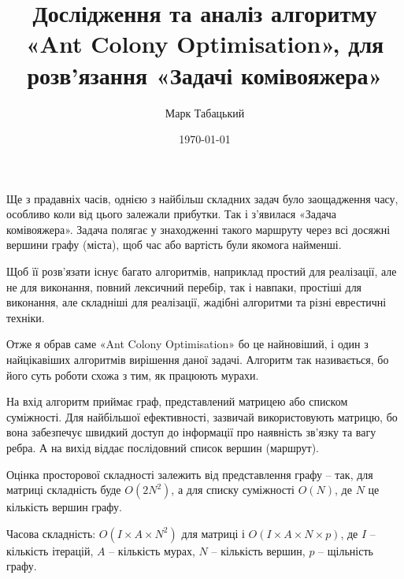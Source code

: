 \documentclass[12pt, letterpaper]{article}
\title{Дослідження та аналіз алгоритму «Ant Colony Optimisation», для розв'язання «Задачі комівояжера»}
\author{Марк Табацький}
\date{\today}
\begin{document}
\maketitle
Ще з прадавніх часів, однією з найбільш складних задач було заощадження часу, особливо коли від цього залежали прибутки. Так і з'явилася «Задача комівояжера». 
Задача полягає у знаходженні такого маршруту через всі досяжні вершини графу (міста), щоб час або вартість були якомога найменші. 

Щоб її розв'язати існує багато алгоритмів, наприклад простий для реалізації, але не для виконання, повний лексичний перебір, так і навпаки, 
простіші для виконання, але складніші для реалізації, жадібні алгоритми та різні еврестичні техніки. 

Отже я обрав саме «Ant Colony Optimisation» бо це найновіший, і один з найцікавіших алгоритмів вирішення даної задачі. 
Алгоритм так називається, бо його суть роботи схожа з тим, як працюють мурахи. 

На вхід алгоритм приймає граф, представлений матрицею або списком суміжності. Для найбільшої ефективності, зазвичай використовують матрицю, 
бо вона забезпечує швидкий доступ до інформації про наявність зв'язку та вагу ребра. А на вихід віддає послідовний список вершин (маршрут). 

Оцінка просторової складності залежить від представлення графу – так, для матриці складність буде $O(2N^2)$, 
а для списку суміжності $O(N)$, де $N$ це кількість вершин графу.

Часова складність: $O(I \times A \times N^2)$ для матриці і $O(I \times A \times N \times p)$, 
де $I$ – кількість ітерацій, $A$ – кількість мурах, $N$ – кількість вершин, $p$ – щільність графу.
\end{document}
